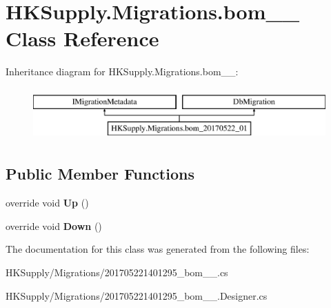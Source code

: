 \hypertarget{class_h_k_supply_1_1_migrations_1_1bom__20170522__01}{}\section{H\+K\+Supply.\+Migrations.\+bom\+\_\+\_ Class Reference}
\label{class_h_k_supply_1_1_migrations_1_1bom__20170522__01}
Inheritance diagram for H\+K\+Supply.\+Migrations.\+bom\+\_\+\_\+:\begin{figure}[H]
\begin{center}
\leavevmode
\includegraphics[height=2.000000cm]{class_h_k_supply_1_1_migrations_1_1bom__20170522__01}
\end{center}
\end{figure}
\subsection*{Public Member Functions}
\begin{DoxyCompactItemize}
\item 
\mbox{\label{class_h_k_supply_1_1_migrations_1_1bom__20170522__01_ad8bac4eb3d84af6e8da21077de502e0a}} 
override void {\bfseries Up} ()
\item 
\mbox{\label{class_h_k_supply_1_1_migrations_1_1bom__20170522__01_a3c64a17cb39f731a175690367e7664fe}} 
override void {\bfseries Down} ()
\end{DoxyCompactItemize}


The documentation for this class was generated from the following files\+:\begin{DoxyCompactItemize}
\item 
H\+K\+Supply/\+Migrations/201705221401295\+\_\+bom\+\_\+\_.\+cs\item 
H\+K\+Supply/\+Migrations/201705221401295\+\_\+bom\+\_\+\_.\+Designer.\+cs\end{DoxyCompactItemize}
